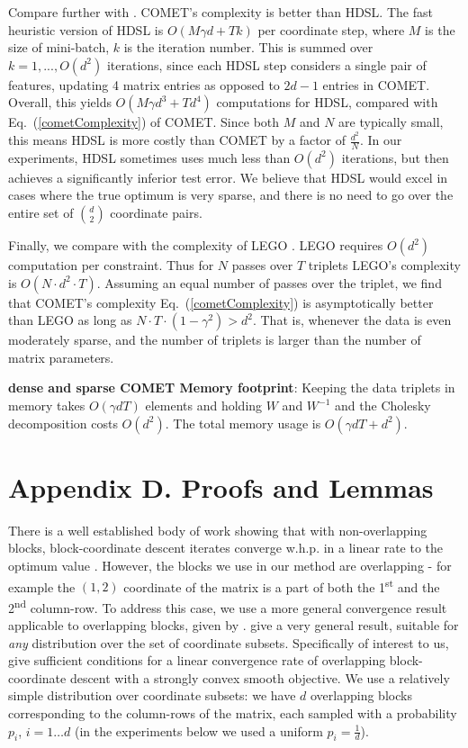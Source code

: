 \documentclass[twoside,11pt]{article}
\newcommand\mat[1]{{#1}}
\newcommand{\W}{\mat{W}}
\renewcommand{\eqref}[1]{Eq.~(\ref{#1})}
\begin{document}
Compare further with \citet{HDSL}. COMET’s complexity is better than HDSL. The fast heuristic version of HDSL is $O(M\gamma d+Tk)$ per coordinate step, where $M$ is the size of mini-batch, $k$ is the iteration number. This is summed over $k=1,...,O(d^2)$ iterations, since each HDSL step considers a single pair of features, updating 4 matrix entries as opposed to $2d-1$ entries in COMET. Overall, this yields $O(M\gamma d^3+Td^4)$ computations for HDSL, compared with \eqref{cometComplexity} of COMET. Since both $M$ and $N$ are typically small, this means HDSL is more costly than COMET by a factor of $\frac{d^2}{N}$. In our experiments, HDSL sometimes uses much less than $O(d^2)$ iterations, but then achieves a significantly inferior test error. We believe that HDSL would excel in cases where the true optimum is very sparse, and there is no need to go over the entire set of $d \choose 2$ coordinate pairs.

Finally, we compare with the complexity of LEGO \citep{lego}. LEGO requires $O(d^2)$ computation per constraint. Thus for $N$ passes over $T$ triplets LEGO's complexity is $O(N\cdot d^2 \cdot T)$. Assuming an equal number of passes over the triplet, we find that COMET's complexity \eqref{cometComplexity} is asymptotically better than LEGO as long as $N \cdot T \cdot (1-\gamma^2) > d^2$. That is, whenever the data is even moderately sparse, and the number of triplets is larger than the number of matrix parameters.

{\bf dense and sparse COMET Memory footprint}: Keeping the data triplets in memory takes $O(\gamma d T)$ elements and holding $\W$ and $\W^{-1}$ and the Cholesky decomposition costs $O(d^2)$. The total memory usage is $O(\gamma d T + d^2)$. 


\section*{Appendix D. Proofs and Lemmas}

There is a well established body of work showing that with non-overlapping blocks, block-coordinate descent iterates converge w.h.p. in a linear rate to the optimum value \citep{nesterov2012efficiency,richtarik2014iteration}.
However, the blocks we use in our method are overlapping - for example the $(1,2)$ coordinate of the matrix is a part of both the 1\textsuperscript{st} and the 2\textsuperscript{nd} column-row. To address this case, we use a more general convergence result applicable to overlapping blocks, given by \citet{richtarik2013optimal}. \citeauthor{richtarik2013optimal} give a very general result, suitable for \emph{any} distribution over the set of coordinate subsets. 
Specifically of interest to us, \citeauthor{richtarik2013optimal} give sufficient conditions for a linear convergence rate of overlapping block-coordinate descent with a strongly convex smooth objective. 
We use a relatively simple distribution over coordinate subsets: we have $d$ overlapping blocks corresponding to the column-rows of the matrix, each sampled with a probability $p_i$, $i=1 \ldots d$ (in the experiments below we used a uniform $p_i = \frac{1}{d}$).
\end{document}
